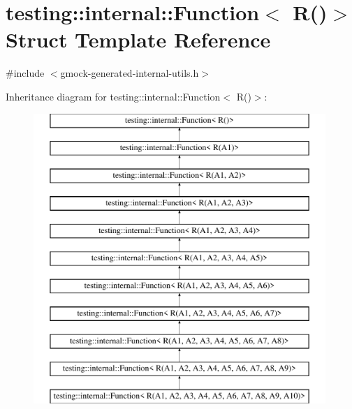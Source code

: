 \hypertarget{structtesting_1_1internal_1_1Function_3_01R_07_08_4}{}\section{testing\+::internal\+::Function$<$ R()$>$ Struct Template Reference}
\label{structtesting_1_1internal_1_1Function_3_01R_07_08_4}


{\ttfamily \#include $<$gmock-\/generated-\/internal-\/utils.\+h$>$}

Inheritance diagram for testing\+::internal\+::Function$<$ R()$>$\+:\begin{figure}[H]
\begin{center}
\leavevmode
\includegraphics[height=11.000000cm]{structtesting_1_1internal_1_1Function_3_01R_07_08_4}
\end{center}
\end{figure}
